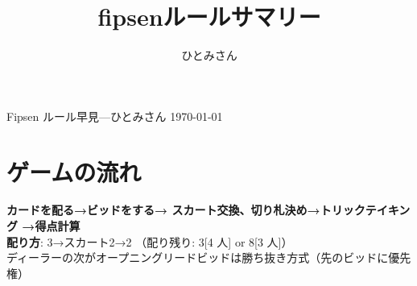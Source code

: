 \documentclass[line_length=50zw,head_space=2cm,foot_space=1cm]{jlreq}
\begin{document}
\pagestyle{empty}

\vspace{-1cm}
\title{fipsenルールサマリー}
\author{ひとみさん}

\begin{center}
{\LARGE Fipsen ルール早見}---ひとみさん \today
\end{center}

\setlength{\parindent}{0pt}

\section{ゲームの流れ}
\textbf{\mbox{カードを配る}\hfill →\hfill \mbox{ビッドをする}\hfill →\hfill
\mbox{スカート交換、切り札決め}\hfill →\hfill \mbox{トリックテイキング}\hfill
→\hfill \mbox{得点計算}\hfill}\\
\textbf{配り方}: 3→スカート2→2 （配り残り: 3{\small [4 人]} or 8{\small [3 人]}）\\
ディーラーの次がオープニングリード\hspace*{1\zh}ビッドは勝ち抜き方式（先のビッドに優先権）
\end{document}
